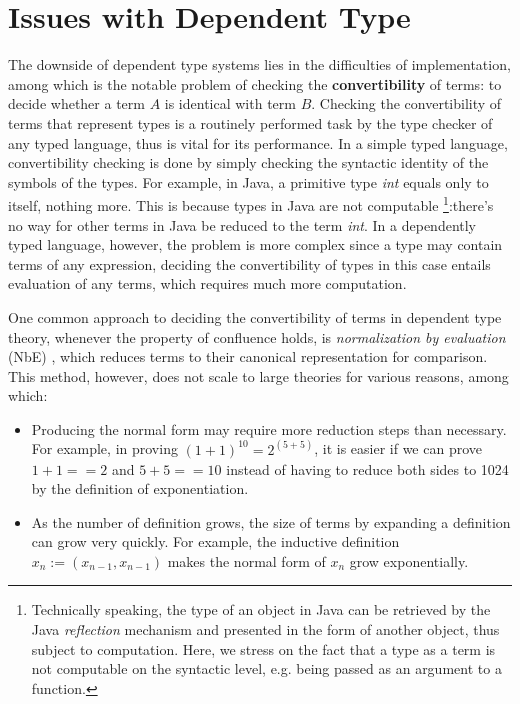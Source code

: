 \section{Issues with Dependent Type}
The downside of dependent type systems lies in the difficulties of implementation, among which is the notable problem of checking the \textbf{convertibility} of terms: to decide whether a term $A$ is identical with term $B$. Checking the convertibility of terms that represent types is a routinely performed task by the type checker of any typed language, thus is vital for its performance. In a simple typed language, convertibility checking is done by simply checking the syntactic identity of the symbols of the types. For example, in Java, a primitive type \emph{int} equals only to itself, nothing more. This is because types in Java are not computable \footnote{Technically speaking, the type of an object in Java can be retrieved by the Java \emph{reflection} mechanism and presented in the form of another object, thus subject to computation. Here, we stress on the fact that a type as a term is not computable on the syntactic level, e.g. being passed as an argument to a function.}:there's no way for other terms in Java be reduced to the term \emph{int}. In a dependently typed language, however, the problem is more complex since a type may contain terms of any expression, deciding the convertibility of types in this case entails evaluation of any terms, which requires much more computation.

One common approach to deciding the convertibility of terms in dependent type theory, whenever the property of confluence holds, is \textit{normalization by evaluation} (NbE) \cite{berger1998normalization}, which reduces terms to their canonical representation for comparison. This method, however, does not scale to large theories for various reasons, among which:
\begin{itemize}
\item Producing the normal form may require more reduction steps than necessary. For example, in proving $(1 + 1) ^ {10} = 2 ^{(5 + 5)}$, it is easier if we can prove $1 + 1 == 2$ and $5 + 5 == 10$ instead of having to reduce both sides to 1024 by the definition of exponentiation.
\item As the number of definition grows, the size of terms by expanding a definition can grow very quickly. For example, the inductive definition $x_n := (x_{n-1}, x_{n-1})$ makes the normal form of $x_{n}$ grow exponentially.
\end{itemize}

